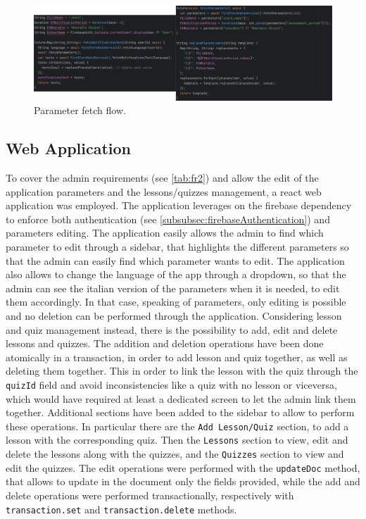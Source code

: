 \begin{figure}
    \centering
    \includegraphics[width=1.0\linewidth]{./images/parameters.jpg}
    \caption{Parameter fetch flow.}
\end{figure}

\subsection{Web Application}
To cover the admin requirements (see \cref{tab:fr2}) and allow the edit of the application parameters and the lessons/quizzes management, a react web application was employed.
\newline The application leverages on the firebase dependency \cite{Firebase} to enforce both authentication (see \cref{subsubsec:firebaseAuthentication}) and parameters editing.
\newline The application easily allows the admin to find which parameter to edit through a sidebar, that highlights the different parameters so that the admin can easily find which parameter wants to edit. The application also allows to change the language of the app through a dropdown, so that the admin can see the italian version of the parameters when it is needed, to edit them accordingly. In that case, speaking of parameters, only editing is possible and no deletion can be performed through the application.   
\newline Considering lesson and quiz management instead, there is the possibility to add, edit and delete lessons and quizzes. The addition and deletion operations have been done atomically in a transaction, in order to add lesson and quiz together, as well as deleting them together. This in order to link the lesson with the quiz through the \texttt{quizId} field and avoid inconsistencies like a quiz with no lesson or viceversa, which would have required at least a dedicated screen to let the admin link them together. Additional sections have been added to the sidebar to allow to perform these operations. In particular there are the \texttt{Add Lesson/Quiz} section, to add a lesson with the corresponding quiz. Then the \texttt{Lessons} section to view, edit and delete the lessons along with the quizzes, and the \texttt{Quizzes} section to view and edit the quizzes. 
\newpage \noindent The edit operations were performed with the \texttt{updateDoc} method, that allows to update in the document only the fields provided, while the add and delete operations were performed transactionally, respectively with \texttt{transaction.set}  and \texttt{transaction.delete} methods.

